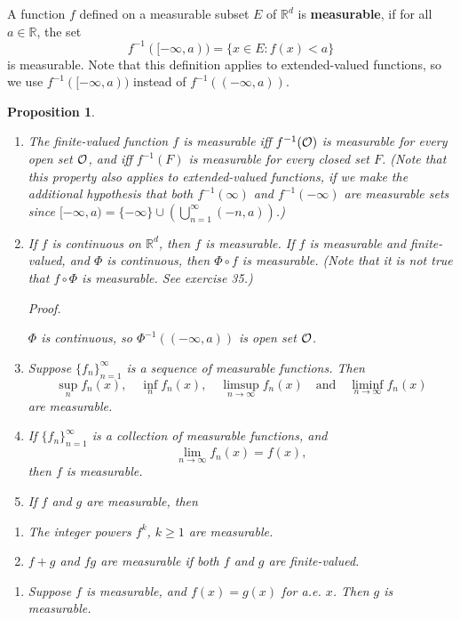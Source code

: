 \documentclass[
]{book}
\providecommand{\tightlist}{%
  \setlength{\itemsep}{0pt}\setlength{\parskip}{0pt}}
\newtheorem{proposition}{Proposition}[chapter]
\theoremstyle{definition}
\theoremstyle{definition}
\theoremstyle{definition}
\theoremstyle{definition}
\theoremstyle{remark}
\begin{document}
A function \(f\) defined on a measurable subset \(E\) of \(\mathbb{R}^d\) is \textbf{measurable}, if for all \(a\in\mathbb{R}\), the set
\[
f^{-1}([-\infty,a))=\{x\in E: f(x)<a\}
\]
is measurable. Note that this definition applies to extended-valued functions, so we use \(f^{-1}([-\infty,a))\) instead of \(f^{-1}((-\infty,a))\).

\begin{proposition}
\leavevmode

\begin{enumerate}
\def\labelenumi{\arabic{enumi}.}
\tightlist
\item
  The finite-valued function \(f\) is measurable iff \(f^{-1}(\cal O)\) is measurable for every open set \(\cal O\), and iff \(f^{-1}(F)\) is measurable for every closed set \(F\). (Note that this property also applies to extended-valued functions, if we make the additional hypothesis that both \(f^{-1}(\infty)\) and \(f^{-1}(-\infty)\) are measurable sets since \([-\infty,a)=\{-\infty\}\cup\left(\bigcup_{n=1}^{\infty}(-n,a)\right)\).)
\item
  If \(f\) is continuous on \(\mathbb{R}^d\), then \(f\) is measurable. If \(f\) is measurable and finite-valued, and \(\Phi\) is continuous, then \(\Phi\circ f\) is measurable. (Note that it is not true that \(f\circ\Phi\) is measurable. See exercise 35.)

  \emph{Proof.}

  \(\Phi\) is continuous, so \(\Phi^{-1}((-\infty,a))\) is open set \(\cal O\).
\item
  Suppose \(\{f_n\}_{n=1}^{\infty}\) is a sequence of measurable functions. Then
  \[
  \sup_nf_n(x),\quad \inf_nf_n(x),\quad\limsup_{n\to\infty}f_n(x)\quad \text{and} \quad\liminf_{n\to\infty}f_n(x)
  \]
  are measurable.
\item
  If \(\{f_n\}_{n=1}^{\infty}\) is a collection of measurable functions, and
  \[
  \lim_{n\to\infty}f_n(x)=f(x),
  \]
  then \(f\) is measurable.
\item
  If \(f\) and \(g\) are measurable, then
\end{enumerate}

\begin{enumerate}
\def\labelenumi{(\roman{enumi})}
\tightlist
\item
  The integer powers \(f^k\), \(k\ge 1\) are measurable.
\item
  \(f+g\) and \(fg\) are measurable if both \(f\) and \(g\) are finite-valued.
\end{enumerate}

\begin{enumerate}
\def\labelenumi{\arabic{enumi}.}
\setcounter{enumi}{5}
\tightlist
\item
  Suppose \(f\) is measurable, and \(f(x)=g(x)\) for a.e. \(x\). Then \(g\) is measurable.
\end{enumerate}

\end{proposition}
\end{document}
